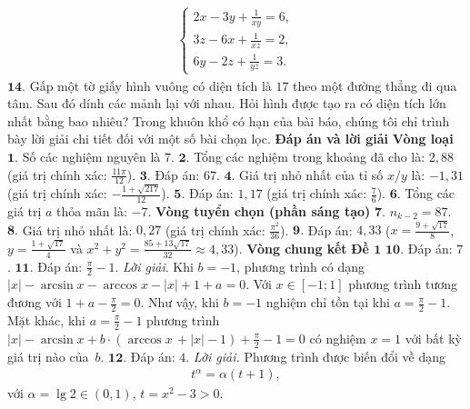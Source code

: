 \begin{multicols}{2}
\begin{align*}
		\begin{cases}
			2x - 3y + \frac{1}{xy} = 6,\\
			3z - 6x + \frac{1}{xz} = 2,\\
			6y - 2z + \frac{1}{yz} = 3.
		\end{cases}
	\end{align*}
	$\pmb{14.}$ Gấp một tờ giấy hình vuông có diện tích là $17$ theo một đường thẳng đi qua tâm. Sau đó dính các mảnh lại với nhau. Hỏi hình được tạo ra có diện tích lớn nhất bằng bao nhiêu?
	\vskip 0.1cm
	Trong khuôn khổ có hạn của bài báo, chúng tôi chỉ trình bày lời giải chi tiết đối với một số bài chọn lọc.  
	\vskip 0.1cm 
	\textbf{\color{cackithi}Đáp án và lời giải}
	\vskip 0.1cm
	\textbf{\color{cackithi}Vòng loại}
	\vskip 0.1cm
	$\pmb{1.}$ Số các nghiệm nguyên là $7$.
	\vskip 0.1cm
	$\pmb{2.}$ Tổng các nghiệm trong khoảng đã cho là: $2{,}88$ (giá trị chính xác: $\frac{11\pi}{12}$).
	\vskip 0.1cm
	$\pmb{3.}$ Đáp án: $67$.
	\vskip 0.1cm
	$\pmb{4.}$ Giá trị nhỏ nhất của tỉ số $x/y$ là: $-1{,}31$ (giá trị chính xác:  $-\frac{1+ \sqrt{217}}{12}$).
	\vskip 0.1cm
	$\pmb{5.}$ Đáp án: $1{,}17$ (giá trị chính xác:  $\frac{7}{6}$).
	\vskip 0.1cm
	$\pmb{6.}$ Tổng các giá trị $a$ thỏa mãn là:  $-7$.
	\vskip 0.1cm
	\textbf{\color{cackithi}Vòng tuyển chọn (phần sáng tạo)}
	\vskip 0.1cm
	$\pmb{7.}$ $n_{k-2}=87$.
	\vskip 0.1cm
	$\pmb{8.}$ Giá trị nhỏ nhất là: $0{,}27$ (giá trị chính xác: $\frac{\pi^2}{36}$).
	\vskip 0.1cm
	$\pmb{9.}$ Đáp án: $4{,}33$ ($x = \frac{9 + \sqrt{17}}{8}$, $y = \frac{1+ \sqrt{17}}{4}$ và  $x^2 + y^2 = \frac{85 + 13\sqrt{17}}{32} \approx 4{,}33$).
	\vskip 0.1cm
	\textbf{\color{cackithi}Vòng chung kết}
	\vskip 0.1cm
	\textbf{\color{cackithi}Đề $\pmb{1}$}
	\vskip 0.1cm
	$\pmb{10.}$ Đáp án: $7$.
	\vskip 0.1cm 
	$\pmb{11.}$ Đáp án:  $\frac{\pi}{2} -1$.
	\vskip 0.1cm 
	\textit{Lời giải}. Khi  $b = -1$, phương trình có dạng $|x| - \arcsin x - \arccos x - |x| + 1 + a = 0$. Với $x \in [-1;1]$ phương trình tương đương với $1 + a - \frac{\pi}{2} = 0$. Như vậy, khi $b = -1$  nghiệm chỉ tồn tại khi $a = \frac{\pi}{2} - 1$.
	\vskip 0.1cm
	Mặt khác, khi $a = \frac{\pi}{2} -1$ phương trình $|x| - \arcsin x + b \cdot (\arccos x\, + |x| - 1) + \frac{\pi }{2} - 1 = 0$ có nghiệm $x =1$ với bất kỳ giá trị nào của~$b$.
	\vskip 0.1cm
	$\pmb{12.}$ Đáp án: $4$.
	\vskip 0.1cm 
	\textit{Lời giải.} Phương trình được biến đổi về dạng 
	\begin{align*}
		{t^\alpha } = \alpha (t + 1),
	\end{align*}
	với $\alpha  = \lg 2 \in (0,1)$, $t = {x^2} - 3 > 0$.
	\vskip 0.1cm

\end{multicols}
